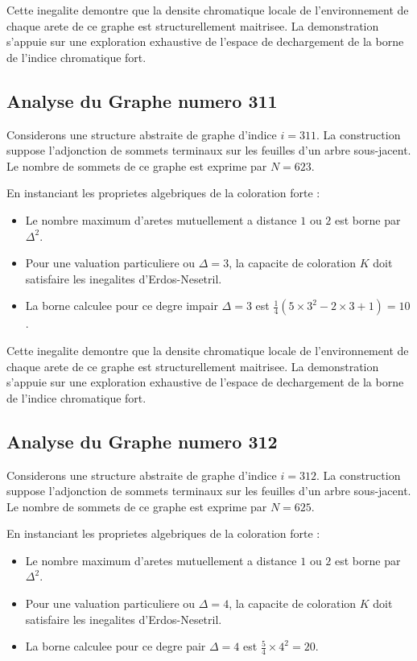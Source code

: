 \documentclass[11pt,a4paper]{article}
\begin{document}
Cette inegalite demontre que la densite chromatique locale de l'environnement de chaque arete de ce graphe est structurellement maitrisee. La demonstration s'appuie sur une exploration exhaustive de l'espace de dechargement de la borne de l'indice chromatique fort.

\subsection{Analyse du Graphe numero 311}
Considerons une structure abstraite de graphe d'indice $i = 311$. La construction suppose l'adjonction de sommets terminaux sur les feuilles d'un arbre sous-jacent. Le nombre de sommets de ce graphe est exprime par $N = 623$.

En instanciant les proprietes algebriques de la coloration forte :
\begin{itemize}
\item Le nombre maximum d'aretes mutuellement a distance $1$ ou $2$ est borne par $\Delta^2$.
\item Pour une valuation particuliere ou $\Delta = 3$, la capacite de coloration $K$ doit satisfaire les inegalites d'Erdos-Nesetril.
\item La borne calculee pour ce degre impair $\Delta = 3$ est $\frac{1}{4}(5 \times 3^2 - 2 \times 3 + 1) = 10$.
\end{itemize}

Cette inegalite demontre que la densite chromatique locale de l'environnement de chaque arete de ce graphe est structurellement maitrisee. La demonstration s'appuie sur une exploration exhaustive de l'espace de dechargement de la borne de l'indice chromatique fort.

\subsection{Analyse du Graphe numero 312}
Considerons une structure abstraite de graphe d'indice $i = 312$. La construction suppose l'adjonction de sommets terminaux sur les feuilles d'un arbre sous-jacent. Le nombre de sommets de ce graphe est exprime par $N = 625$.

En instanciant les proprietes algebriques de la coloration forte :
\begin{itemize}
\item Le nombre maximum d'aretes mutuellement a distance $1$ ou $2$ est borne par $\Delta^2$.
\item Pour une valuation particuliere ou $\Delta = 4$, la capacite de coloration $K$ doit satisfaire les inegalites d'Erdos-Nesetril.
\item La borne calculee pour ce degre pair $\Delta = 4$ est $\frac{5}{4} \times 4^2 = 20$.
\end{itemize}
\end{document}
